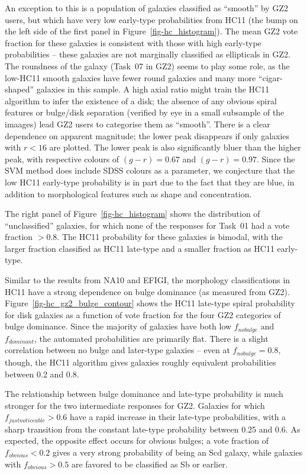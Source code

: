\documentclass[useAMS,usenatbib]{mn2e}
\begin{document}
An exception to this is a population of galaxies classified as ``smooth'' by GZ2 users, but which have very low early-type probabilities from HC11 (the bump on the left side of the first panel in Figure~\ref{fig-hc_histogram}). The mean GZ2 vote fraction for these galaxies is consistent with those with high early-type probabilities -- these galaxies are not marginally classified as ellipticals in GZ2. The roundness of the galaxy (Task~07 in GZ2) seems to play some role, as the low-HC11 smooth galaxies have fewer round galaxies and many more ``cigar-shaped'' galaxies in this sample. A high axial ratio might train the HC11 algorithm to infer the existence of a disk; the absence of any obvious spiral features or bulge/disk separation (verified by eye in a small subsample of the imaages) lead GZ2 users to categorise them as ``smooth''. There is a clear dependence on apparent magnitude; the lower peak disappears if only galaxies with $r<16$ are plotted. The lower peak is also significantly bluer than the higher peak, with respective colours of $(g-r)=0.67$ and $(g-r)=0.97$. Since the SVM method does include SDSS colours as a parameter, we conjecture that the low HC11 early-type probability is in part due to the fact that they are blue, in addition to morphological features such as shape and concentration. %

The right panel of Figure~\ref{fig-hc_histogram} shows the distribution of ``unclassified'' galaxies, for which none of the responses for Task~01 had a vote fraction $>0.8$. The HC11 probability for these galaxies is bimodal, with the larger fraction classified as HC11 late-type and a smaller fraction as HC11 early-type. 

Similar to the results from NA10 and EFIGI, the morphology classifications in HC11 have a strong dependence on bulge dominance (as measured from GZ2). Figure~\ref{fig-hc_gz2_bulge_contour} shows the HC11 late-type spiral probability for disk galaxies as a function of vote fraction for the four GZ2 categories of bulge dominance. Since the majority of galaxies have both low $f_{no bulge}$ and $f_{dominant}$, the automated probabilities are primarily flat. There is a slight correlation between no bulge and later-type galaxies -- even at $f_{no bulge}=0.8$, though, the HC11 algorithm gives galaxies roughly equivalent probabilities between 0.2 and 0.8. 

The relationship between bulge dominance and late-type probability is much stronger for the two intermediate responses for GZ2. Galaxies for which $f_{just noticeable}>0.6$ have a rapid increase in their late-type probabilities, with a sharp transition from the constant late-type probability between 0.25 and 0.6. As expected, the opposite effect occurs for obvious bulges; a vote fraction of $f_{obvious}<0.2$ gives a very strong probability of being an Scd galaxy, while galaxies with $f_{obvious}>0.5$ are favored to be classified as Sb or earlier. 
\end{document}
